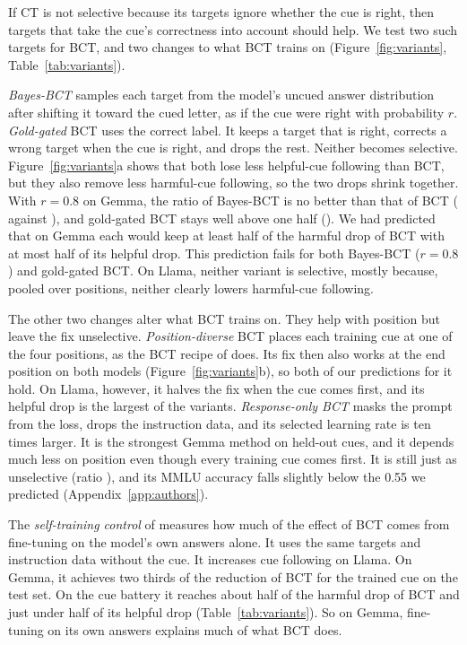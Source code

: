 \documentclass[11pt]{article}
\newcommand{\gemma}{Gemma}\newcommand{\gemmafull}{Gemma-2-2B-it}
\newcommand{\llama}{Llama}\newcommand{\llamafull}{Llama-3.1-8B-Instruct}
\begin{document}
If CT is not selective because its targets ignore whether the cue is right, then targets that take the cue's correctness into account should help. We test two such targets for BCT, and two changes to what BCT trains on (Figure~\ref{fig:variants}, Table~\ref{tab:variants}).

\emph{Bayes-BCT} samples each target from the model's uncued answer distribution after shifting it toward the cued letter, as if the cue were right with probability $r$. \emph{Gold-gated} BCT uses the correct label. It keeps a target that is right, corrects a wrong target when the cue is right, and drops the rest. Neither becomes selective. Figure~\ref{fig:variants}a shows that both lose less helpful-cue following than BCT, but they also remove less harmful-cue following, so the two drops shrink together. With $r{=}0.8$ on \gemma, the ratio of Bayes-BCT is no better than that of BCT (\vGemBayesEightCAI{} against \vGemBctCAI), and gold-gated BCT stays well above one half (\vGemGoldCAI). We had predicted that on \gemma{} each would keep at least half of the harmful drop of BCT with at most half of its helpful drop. This prediction fails for both Bayes-BCT ($r{=}0.8$) and gold-gated BCT. On \llama, neither variant is selective, mostly because, pooled over positions, neither clearly lowers harmful-cue following.

The other two changes alter what BCT trains on. They help with position but leave the fix unselective. \emph{Position-diverse} BCT places each training cue at one of the four positions, as the BCT recipe of \citet{chua2024bct} does. Its fix then also works at the end position on both models (Figure~\ref{fig:variants}b), so both of our predictions for it hold. On \llama, however, it halves the fix when the cue comes first, and its helpful drop is the largest of the variants. \emph{Response-only BCT} \citep{irpan2025consistency} masks the prompt from the loss, drops the instruction data, and its selected learning rate is ten times larger. It is the strongest \gemma{} method on held-out cues, and it depends much less on position even though every training cue comes first. It is still just as unselective (ratio \vGemBctroCAI), and its MMLU accuracy falls slightly below the 0.55 we predicted (Appendix~\ref{app:authors}).

The \emph{self-training control} of \citet{chua2024bct} measures how much of the effect of BCT comes from fine-tuning on the model's own answers alone. It uses the same targets and instruction data without the cue. It increases cue following on \llama. On \gemma, it achieves two thirds of the reduction of BCT for the trained cue on the test set. On the cue battery it reaches about half of the harmful drop of BCT and just under half of its helpful drop (Table~\ref{tab:variants}). So on \gemma, fine-tuning on its own answers explains much of what BCT does.
\end{document}
